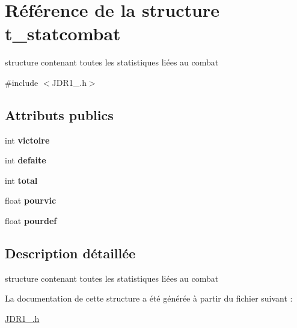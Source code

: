 \hypertarget{structt__statcombat}{\section{Référence de la structure t\-\_\-statcombat}
\label{structt__statcombat}
}


structure contenant toutes les statistiques liées au combat  




{\ttfamily \#include $<$J\-D\-R1\-\_.\-h$>$}

\subsection*{Attributs publics}
\begin{DoxyCompactItemize}
\item 
\hypertarget{structt__statcombat_a4edfc4a7c87639782addb649d1aa43b3}{int {\bfseries victoire}}\label{structt__statcombat_a4edfc4a7c87639782addb649d1aa43b3}

\item 
\hypertarget{structt__statcombat_a421582b83575c718ca753aa3ed00c8bb}{int {\bfseries defaite}}\label{structt__statcombat_a421582b83575c718ca753aa3ed00c8bb}

\item 
\hypertarget{structt__statcombat_a118c899f6ffd51093d8742a3e35ac3db}{int {\bfseries total}}\label{structt__statcombat_a118c899f6ffd51093d8742a3e35ac3db}

\item 
\hypertarget{structt__statcombat_a5542c3edd67cd27fed17f5e7d6d53f06}{float {\bfseries pourvic}}\label{structt__statcombat_a5542c3edd67cd27fed17f5e7d6d53f06}

\item 
\hypertarget{structt__statcombat_aa31e993cc641c954c9b8072829d94d43}{float {\bfseries pourdef}}\label{structt__statcombat_aa31e993cc641c954c9b8072829d94d43}

\end{DoxyCompactItemize}


\subsection{Description détaillée}
structure contenant toutes les statistiques liées au combat 

La documentation de cette structure a été générée à partir du fichier suivant \-:\begin{DoxyCompactItemize}
\item 
\hyperlink{JDR1__0_8h}{J\-D\-R1\-\_.\-h}\end{DoxyCompactItemize}
